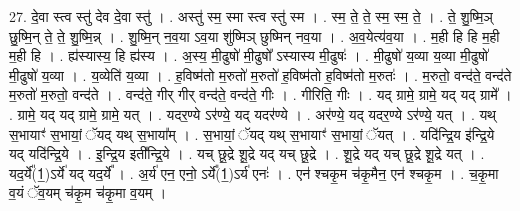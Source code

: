 \documentclass[17pt]{extarticle}
\begin{document}
27. दे॒वा स्त्व स्तु॑ देव दे॒वा स्तु॑ । . अस्तु॑ स्म॒ स्मा स्त्व स्तु॑ स्म । . स्म॒ ते॒ ते॒ स्म॒ स्म॒ ते॒ । . ते॒ शु॒ष्मि॒ञ् छु॒ष्मि॒न् ते॒ ते॒ शु॒ष्मि॒न्न् । . शु॒ष्मि॒न् न॒व॒या ऽव॒या शु॑ष्मिञ् छुष्मिन् नव॒या । . अ॒व॒येत्य॑व॒या । . म॒ही हि हि म॒ही म॒ही हि । . ह्य॑स्यास्य॒ हि ह्य॑स्य । . अ॒स्य॒ मी॒ढुषो॑ मी॒ढुषो᳚ ऽस्यास्य मी॒ढुषः॑ । . मी॒ढुषो॑ य॒व्या य॒व्या मी॒ढुषो॑ मी॒ढुषो॑ य॒व्या । . य॒व्येति॑ य॒व्या । . ह॒विष्म॑तो म॒रुतो॑ म॒रुतो॑ ह॒विष्म॑तो ह॒विष्म॑तो म॒रुतः॑ । . म॒रुतो॒ वन्द॑ते॒ वन्द॑ते म॒रुतो॑ म॒रुतो॒ वन्द॑ते । . वन्द॑ते॒ गीर् गीर् वन्द॑ते॒ वन्द॑ते॒ गीः । . गीरिति॒ गीः । . यद् ग्रामे॒ ग्रामे॒ यद् यद् ग्रामे᳚ । . ग्रामे॒ यद् यद् ग्रामे॒ ग्रामे॒ यत् । . यदर॒ण्ये ऽर॑ण्ये॒ यद् यदर॑ण्ये । . अर॑ण्ये॒ यद् यदर॒ण्ये ऽर॑ण्ये॒ यत् । . यथ् स॒भायाꣳ॑ स॒भायां॒ ॅयद् यथ् स॒भाया᳚म् । . स॒भायां॒ ॅयद् यथ् स॒भायाꣳ॑ स॒भायां॒ ॅयत् । . यदि॑न्द्रि॒य इ॑न्द्रि॒ये यद् यदि॑न्द्रि॒ये । . इ॒न्द्रि॒य इती᳚न्द्रि॒ये । . यच् छू॒द्रे शू॒द्रे यद् यच् छू॒द्रे । . शू॒द्रे यद् यच् छू॒द्रे शू॒द्रे यत् । . यद॒र्ये᳚(1॒)ऽर्ये॑ यद् यद॒र्ये᳚ । . अ॒र्य॑ एन॒ एनो॒ ऽर्ये᳚(1॒)ऽर्य॑ एनः॑ । . एन॑ श्चकृ॒म च॑कृ॒मैन॒ एन॑ श्चकृ॒म । . च॒कृ॒मा व॒यं ॅव॒यम् च॑कृ॒म च॑कृ॒मा व॒यम् । \newline
\end{document}
